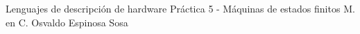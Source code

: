 




	\pnormal
	{Lenguajes de descripción de hardware}
	{Práctica 5  - Máquinas de estados finitos}
	{M. en C. Osvaldo Espinosa Sosa}
	\tableofcontents
	
	\newpage 
	\newpage 
	\clearpage 
	\clearpage 
	\clearpage 
	\clearpage 
	\clearpage 
	\newpage 



